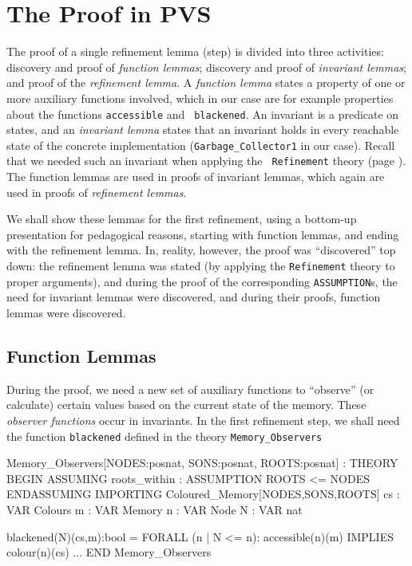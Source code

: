 
\section{The Proof in PVS}
\label{pvs-proof}

\noindent The proof of a single refinement lemma (step) is divided into 
three activities:   discovery   and proof of  {\em   function lemmas};
discovery and proof of {\em  invariant lemmas}; and  proof of the {\em
  refinement lemma}\@.  A {\em function lemma}  states a property of one
or more   auxiliary functions  involved,  which  in our case   are for
example  properties  about the  functions   {\tt accessible} and  {\tt
  blackened}\@.  An invariant  is  a predicate on  states,  and  an {\em
  invariant lemma} states that an  invariant holds in every  reachable
state of the concrete implementation ({\tt Garbage\_Collector1} in our
case)\@.  Recall that we needed such an invariant when applying the {\tt
  Refinement} theory   (page  \pageref{pvs-mappings})\@.  The   function
lemmas are used in proofs of invariant lemmas, which again are used in
proofs of {\em refinement lemmas}\@.

We shall show these lemmas for the first refinement, using a bottom-up
presentation for  pedagogical reasons, starting  with function lemmas,
and ending with the refinement lemma.  In, reality, however, the proof
was ``discovered''   top  down: the refinement   lemma  was stated (by
applying the {\tt Refinement} theory to  proper arguments), and during
the proof of   the  corresponding {\tt  ASSUMPTION}s,   the need  for
invariant lemmas were   discovered, and during  their proofs, function
lemmas were discovered.


\subsection{Function Lemmas}

During  the proof,   we  need a new   set  of auxiliary  functions  to
``observe'' (or calculate)  certain values based  on the current state
of the memory.  These {\em observer functions} occur in invariants.  In
the first refinement step, we shall need  the function {\tt blackened}
defined  in   the     theory {\tt  Memory\_Observers}

\begin{smallsession}
Memory_Observers[NODES:posnat, SONS:posnat, ROOTS:posnat] : THEORY
BEGIN
  ASSUMING
    roots_within : ASSUMPTION ROOTS <= NODES
  ENDASSUMING
  IMPORTING Coloured_Memory[NODES,SONS,ROOTS]
  cs : VAR Colours
  m  : VAR Memory
  n  : VAR Node
  N  : VAR nat

  blackened(N)(cs,m):bool =
    FORALL (n | N <= n): accessible(n)(m) IMPLIES colour(n)(cs)
  ...
END Memory_Observers
\end{smallsession}
\label{observer-functions}

